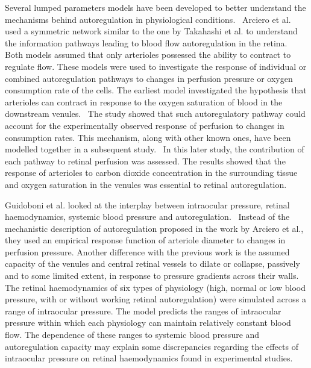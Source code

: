 \documentclass{article}
\begin{document}
Several lumped parameters models have been developed to better understand the mechanisms behind autoregulation in physiological conditions.~\cite{Arciero_2008,Arciero_2013,Guidoboni_2014a}
Arciero et al. used a symmetric network similar to the one by Takahashi et al. to understand the information pathways leading to blood flow autoregulation in the retina.~\cite{Arciero_2008,Arciero_2013}
Both models assumed that only arterioles possessed the ability to contract to regulate flow.
These models were used to investigate the response of individual or combined autoregulation pathways to changes in perfusion pressure or oxygen consumption rate of the cells.
The earliest model investigated the hypothesis that arterioles can contract in response to the oxygen saturation of blood in the downstream venules.~\cite{Arciero_2008}
The study showed that such autoregulatory pathway could account for the experimentally observed response of perfusion to changes in consumption rates.
This mechanism, along with other known ones, have been modelled together in a subsequent study.~\cite{Arciero_2013}
In this later study, the contribution of each pathway to retinal perfusion was assessed.
The results showed that the response of arterioles to carbon dioxide concentration in the surrounding tissue and oxygen saturation in the venules was essential to retinal autoregulation.~\cite{Arciero_2013}

Guidoboni et al. looked at the interplay between intraocular pressure, retinal haemodynamics, systemic blood pressure and autoregulation.~\cite{Guidoboni_2014a}
Instead of the mechanistic description of autoregulation proposed in the work by Arciero et al., they used an empirical response function of arteriole diameter to changes in perfusion pressure.
Another difference with the previous work is the assumed capacity of the venules and central retinal vessels to dilate or collapse, passively and to some limited extent, in response to pressure gradients across their walls.
The retinal haemodynamics of six types of physiology (high, normal or low blood pressure, with or without working retinal autoregulation) were simulated across a range of intraocular pressure.
The model predicts the ranges of intraocular pressure within which each physiology can maintain relatively constant blood flow.
The dependence of these ranges to systemic blood pressure and autoregulation capacity may explain some discrepancies regarding the effects of intraocular pressure on retinal haemodynamics found in experimental studies.~\cite{Guidoboni_2014a} 
\end{document}

